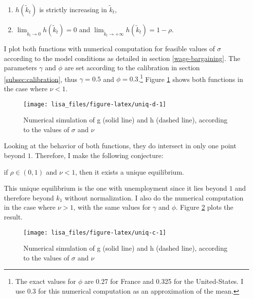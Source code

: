 \documentclass[
]{article}
\providecommand{\tightlist}{%
  \setlength{\itemsep}{0pt}\setlength{\parskip}{0pt}}
\let\BeginKnitrBlock\begin \let\EndKnitrBlock\end
\begin{document}
\begin{enumerate}
\def\labelenumi{\arabic{enumi}.}
\tightlist
\item
  \(h(\tilde{k}_t)\) is strictly increasing in \(\tilde{k}_t\),
\item
  \(\lim_{\tilde{k}_t\to 0} h(\tilde{k}_t) = 0\) and \(\lim_{\tilde{k}_t\to +\infty} h(\tilde{k}_t) = 1-\rho\).
\end{enumerate}

I plot both functions with numerical computation for feasible values of \(\sigma\) according to the model conditions as detailed in section \ref{wage-bargaining}. The parameters \(\gamma\) and \(\phi\) are set according to the calibration in section \ref{subsec:calibration}, thus \(\gamma = 0.5\) and \(\phi = 0.3\).\footnote{The exact values for \(\phi\) are 0.27 for France and 0.325 for the United-States. I use 0.3 for this numerical computation as an approximation of the mean.} Figure \ref{fig:uniq-d} shows both functions in the case where \(\nu < 1\).

\begin{figure}[!tb]

{\centering \texttt{[image: lisa\_files/figure-latex/uniq-d-1]} 

}

\caption{Numerical simulation of g (solid line) and h (dashed line), according to the values of $\sigma$ and $\nu$}\label{fig:uniq-d}
\end{figure}

Looking at the behavior of both functions, they do intersect in only one point beyond \(1\). Therefore, I make the following conjecture:

\BeginKnitrBlock{conjecture}
\protect\hypertarget{cnj:rho-higher0-nu-lower1}{}{\label{cnj:rho-higher0-nu-lower1} }if \(\rho \in (0,1)\) and \(\nu < 1\), then it exists a unique equilibrium.
\EndKnitrBlock{conjecture}

This unique equilibrium is the one with unemployment since it lies beyond \(1\) and therefore beyond \(k_1\) without normalization. I also do the numerical computation in the case where \(\nu > 1\), with the same values for \(\gamma\) and \(\phi\). Figure \ref{fig:uniq-c} plots the result.

\begin{figure}[!tb]

{\centering \texttt{[image: lisa\_files/figure-latex/uniq-c-1]} 

}

\caption{Numerical simulation of g (solid line) and h (dashed line), according to the values of $\sigma$ and $\nu$}\label{fig:uniq-c}
\end{figure}
\end{document}
